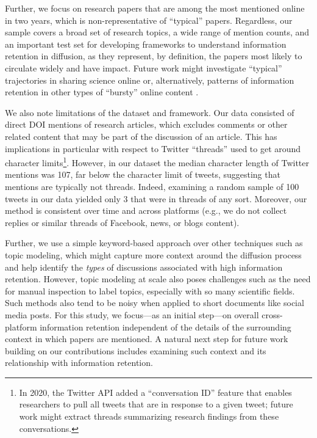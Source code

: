 \documentclass[letterpaper]{article} %
\begin{document}
Further, we focus on research papers that are among the most mentioned online in two years, which is non-representative of ``typical'' papers. Regardless, our sample covers a broad set of research topics, a wide range of mention counts, and an important test set for developing frameworks to understand information retention in diffusion, as they represent, by definition, the papers most likely to circulate widely and have impact. Future work might investigate ``typical'' trajectories in sharing science online \cite[similar to patterns of structural virality in][]{zakhlebinDiffusionScientificArticles2020} or, alternatively, patterns of information retention in other types of ``bursty'' online content \citep{gilbertWidespreadUnderprovisionReddit2013,chengCanCascadesBe2014,chengCascadesRecur2016}.

We also note limitations of the dataset and framework. Our data consisted of direct DOI mentions of research articles, which excludes comments or other related content that may be part of the discussion of an article. This has implications in particular with respect to Twitter ``threads'' used to get around character limits\footnote{In 2020, the Twitter API added a ``conversation ID'' feature that enables researchers to pull all tweets that are in response to a given tweet; future work might extract threads summarizing research findings from these conversations.}. However, in our dataset the median character length of Twitter mentions was 107, far below the character limit of tweets, suggesting that mentions are typically not threads. Indeed, examining a random sample of 100 tweets in our data yielded only 3 that were in threads of any sort. Moreover, our method is consistent over time and across platforms (e.g., we do not collect replies or similar threads of Facebook, news, or blogs content).

Further, we use a simple keyword-based approach over other techniques such as topic modeling, which might capture more context around the diffusion process and help identify the \textit{types} of discussions associated with high information retention. However, topic modeling at scale also poses challenges such as the need for manual inspection to label topics, especially with so many scientific fields. Such methods also tend to be noisy when applied to short documents like social media posts. For this study, we focus---as an initial step---on overall cross-platform information retention independent of the details of the surrounding context in which papers are mentioned. A natural next step for future work building on our contributions includes examining such context and its relationship with information retention.
\end{document}
